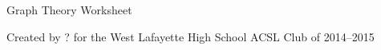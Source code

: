 \documentclass[12pt,letterpaper]{article}
\begin{document}
\begin{center}
  Graph Theory Worksheet
  
  Created by ? for the West Lafayette High School ACSL Club of 2014--2015
\end{center}
\end{document}
